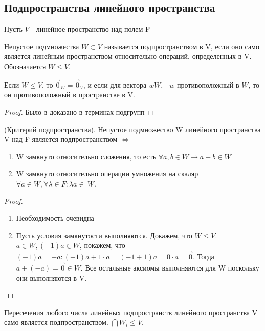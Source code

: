 \subsection{Подпространства линейного пространства}
Пусть \(V\) - линейное пространство над полем F
\begin{definition}
	Непустое подмножества \(W\subset V\) называется подпространством в V, если оно само является линейным пространством относительно операций, определенных в V. Обозначается \(W\le V\).
\end{definition}
\begin{proposition}
	Если \(W\le V\), то \(\vec 0_W = \vec 0_V\), и если для вектора \(w W, - w\text{ противоположный в } W\), то он противоположный в пространстве в V.
\end{proposition}
\begin{proof}
	Было в доказано в терминах подгрупп
\end{proof}
\begin{proposition}
	(Критерий подпространства). \newline
	Непустое подмножество W линейного пространства V над F является подпространством \(\Longleftrightarrow\) \begin{enumerate}
		\item W замкнуто относительно сложения, то есть \(\forall a,b\in W\to a+b\in W\)
		\item W замкнуто относительно операции умножения на скаляр \(\forall a\in W, \forall \lambda\in F: \lambda a\in~W\).
	\end{enumerate}
\end{proposition}
\begin{proof}
	\begin{enumerate}
		\item Необходимость очевидна
		\item Пусть условия замкнутости выполняются. Докажем, что \(W\le V\).\(a\in W, (-1)a\in W\), покажем, что \((-1)a = -a: (-1)a + 1\cdot a = (-1+1)a = 0\cdot a=\vec 0\). Тогда \(a+(-a) =\vec 0\in W\). 
		Все остальные аксиомы выполняются для W поскольку они выполняются в V.
	\end{enumerate}
\end{proof}
\begin{corollary}
	Пересечения любого числа линейных подпространств линейного пространства V само является подпространством. \(\bigcap W_i\le V\).
\end{corollary}
